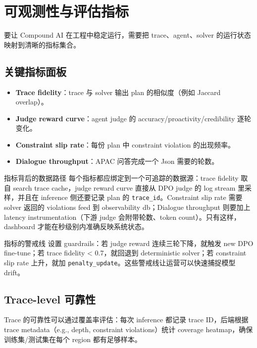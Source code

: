 \section{可观测性与评估指标}

要让 Compound AI 在工程中稳定运行，需要把 trace、agent、solver 的运行状态映射到清晰的指标集合。

\subsection{关键指标面板}

\begin{itemize}
    \item \textbf{Trace fidelity}：trace 与 solver 输出 plan 的相似度（例如 Jaccard overlap）。
    \item \textbf{Judge reward curve}：agent judge 的 accuracy/proactivity/credibility 逐轮变化。
    \item \textbf{Constraint slip rate}：每份 plan 中 constraint violation 的出现频率。
    \item \textbf{Dialogue throughput}：APAC 问答完成一个 Json 需要的轮数。
\end{itemize}

\begin{importantbox}{指标背后的数据路径}
每个指标都应绑定到一个可追踪的数据源：trace fidelity 取自 search trace cache，judge reward curve 直接从 DPO judge 的 log stream 里采样，并且在 inference 侧还要记录 plan 的 \texttt{trace\_id}。Constraint slip rate 需要 solver 返回的 violations feed 到 observability db；Dialogue throughput 则要加上 latency instrumentation（下游 judge 会附带轮数、token count）。只有这样，dashboard 才能在秒级别内准确反映系统状态。
\end{importantbox}

\begin{knowledgebox}{指标的警戒线}
设置 guardrails：若 judge reward 连续三轮下降，就触发 new DPO fine-tune；若 trace fidelity < 0.7，就回退到 deterministic solver；若 constraint slip rate 上升，就加 \texttt{penalty\_update}。这些警戒线让运营可以快速捕捉模型 drift。
\end{knowledgebox}

\subsection{Trace-level 可靠性}

Trace 的可靠性可以通过覆盖率评估：每次 inference 都记录 trace ID，后端根据 trace metadata（e.g., depth, constraint violations）统计 coverage heatmap，确保训练集/测试集在每个 region 都有足够样本。

